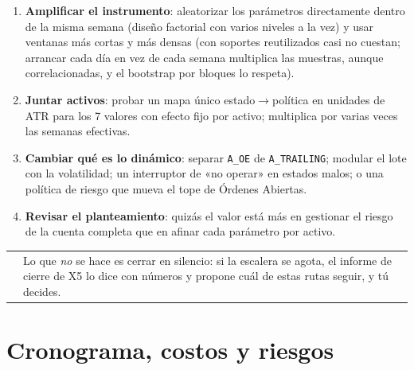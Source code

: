 \documentclass[11pt,a4paper]{article}
\makeatletter
\newcommand{\code}[1]{\texttt{\small #1}}
\newenvironment{caja}[1]{%
  \par\medskip\noindent
  \begin{tabular}{@{}p{0.4em}@{\hspace{8pt}}p{\dimexpr\linewidth-2em\relax}@{}}
  \textcolor{#1}{\rule{3pt}{1.1em}} &
}{\end{tabular}\par\medskip}
\newenvironment{clave}{\begin{caja}{cmorado}}{\end{caja}}
\makeatother
\begin{document}
\begin{enumerate}[leftmargin=1.6em]
  \item \textbf{Amplificar el instrumento}: aleatorizar los parámetros directamente dentro de la misma semana (diseño factorial
        con varios niveles a la vez) y usar ventanas más cortas y más densas (con soportes reutilizados casi no cuestan; arrancar
        cada día en vez de cada semana multiplica las muestras, aunque correlacionadas, y el bootstrap por bloques lo respeta).
  \item \textbf{Juntar activos}: probar un mapa único estado$\rightarrow$política en unidades de ATR para los 7 valores con
        efecto fijo por activo; multiplica por varias veces las semanas efectivas.
  \item \textbf{Cambiar qué es lo dinámico}: separar \code{A\_OE} de \code{A\_TRAILING}; modular el lote con la volatilidad; un
        interruptor de «no operar» en estados malos; o una política de riesgo que mueva el tope de Órdenes Abiertas.
  \item \textbf{Revisar el planteamiento}: quizás el valor está más en gestionar el riesgo de la cuenta completa que en afinar
        cada parámetro por activo.
\end{enumerate}

\begin{clave}
Lo que \emph{no} se hace es cerrar en silencio: si la escalera se agota, el informe de cierre de X5 lo dice con
números y propone cuál de estas rutas seguir, y tú decides.
\end{clave}

\section{Cronograma, costos y riesgos}\label{sec:costos}
\end{document}
